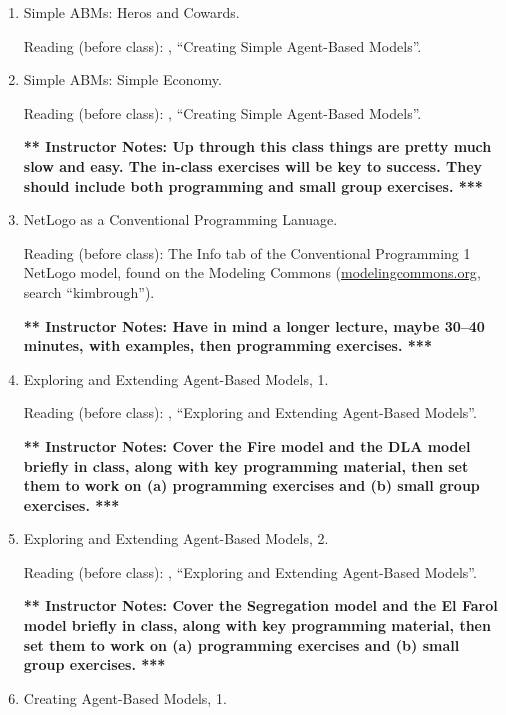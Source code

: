 \documentclass[11pt]{article}
\begin{document}
\begin{enumerate}
\item Simple ABMs: Heros and Cowards.

Reading (before class): \citep[chapter 2, pages 68--87]{wilensky_rand_2015},
``Creating Simple Agent-Based Models''.

\item Simple ABMs: Simple Economy.

Reading (before class): \citep[chapter 2, pages 87--99]{wilensky_rand_2015},
``Creating Simple Agent-Based Models''.

\ifnum{}
{\bf *** Instructor Notes: Up through this class things are pretty
  much slow and easy. The in-class exercises will be key to
  success. They should include both programming and small group exercises. ***}
\fi

\item NetLogo as a Conventional Programming Lanuage.

Reading (before class): The Info tab of the Conventional Programming 1
NetLogo model, found on the Modeling Commons
(\url{modelingcommons.org}, search ``kimbrough'').

\ifnum{}
{\bf *** Instructor Notes: Have in mind a longer lecture, maybe 30--40
  minutes, with examples, then programming exercises. ***}
\fi

\item Exploring and Extending Agent-Based Models, 1.

Reading (before class): \citep[chapter 3, pages 101--128]{wilensky_rand_2015},
``Exploring and Extending Agent-Based Models''.

\ifnum{}
{\bf *** Instructor Notes: Cover the Fire model and the DLA model
  briefly in class, along with key programming material, then set them
  to work on (a) programming exercises and (b) small group exercises. ***}
\fi

\item Exploring and Extending Agent-Based Models, 2.

Reading (before class): \citep[chapter 3, pages 128--153]{wilensky_rand_2015},
``Exploring and Extending Agent-Based Models''.

\ifnum{}
{\bf *** Instructor Notes: Cover the Segregation model and the El Farol model
  briefly in class, along with key programming material, then set them
  to work on (a) programming exercises and (b) small group exercises. ***}
\fi

\item Creating Agent-Based Models, 1.


\end{enumerate}
\end{document}
